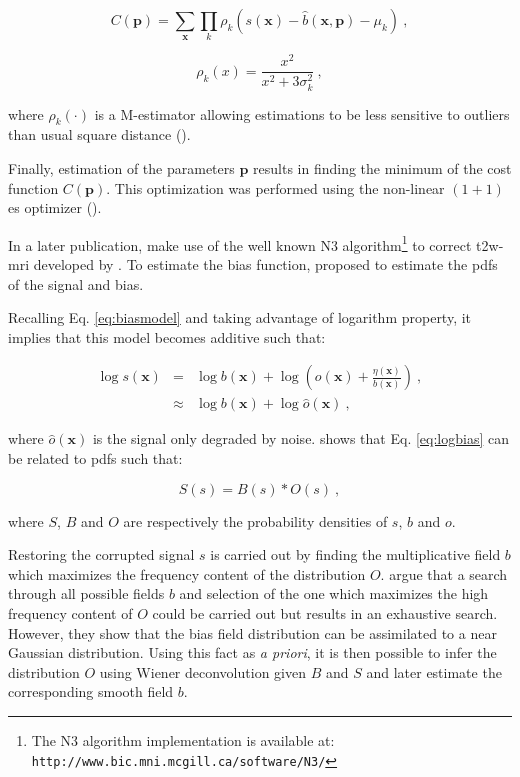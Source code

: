 \begin{enumerate}[leftmargin=*]
\begin{equation}
	C(\mathbf{p}) = \sum_{\mathbf{x}} \prod_{k} \rho_k(s(\mathbf{x}) - \hat{b}(\mathbf{x},\mathbf{p}) - \mu_k) \ ,
	\label{eq:costbias}
\end{equation}

\begin{equation}
	\rho_k(x) = \frac{x^2}{x^2 + 3 \sigma_k^2} \ ,
	\label{eq:mestbias}
\end{equation}

\noindent where $\rho_k(\cdot)$ is a M-estimator allowing estimations to be less sensitive to outliers than usual square distance (\cite{Li1996}).

Finally, estimation of the parameters $\mathbf{p}$ results in finding the minimum of the cost function $C(\mathbf{p})$. This optimization was performed using the non-linear $(1+1)$ \ac{es} optimizer (\cite{Styner1997}).

In a later publication, \cite{Viswanath2012} make use of the well known N3 algorithm\footnote{The N3 algorithm implementation is available at: \texttt{http://www.bic.mni.\allowbreak mcgill.ca/software/N3/}} to correct \ac{t2w}-\ac{mri} developed by \cite{Sled1998}. To estimate the bias function, \cite{Sled1998} proposed to estimate the \acp{pdf} of the signal and bias.

Recalling Eq. \eqref{eq:biasmodel} and taking advantage of logarithm property, it implies that this model becomes additive such that:

\begin{eqnarray}
	\log s(\mathbf{x}) & = & \log b(\mathbf{x}) + \log \left( o(\mathbf{x}) + \frac{\eta(\mathbf{x})}{b(\mathbf{x})} \right) \ , \nonumber \\
	& \approx & \log b(\mathbf{x}) + \log \hat{o}(\mathbf{x}) \ , \label{eq:logbias}
\end{eqnarray}

\noindent where $\hat{o}(\mathbf{x})$ is the signal only degraded by noise. \cite{Sled1998} shows that Eq. \eqref{eq:logbias} can be related to \acp{pdf} such that:

\begin{equation}
	S(s) = B(s) * O(s) \ ,
	\label{eq:distrbias} 
\end{equation}

\noindent where $S$, $B$ and $O$ are respectively the probability densities of $s$, $b$ and $o$.

Restoring the corrupted signal $s$ is carried out by finding the multiplicative field $b$ which maximizes the frequency content of the distribution $O$. \cite{Sled1998} argue that a search through all possible fields $b$ and selection of the one which maximizes the high frequency content of $O$ could be carried out but results in an exhaustive search. However, they show that the bias field distribution can be assimilated to a near Gaussian distribution. Using this fact as \textit{a priori}, it is then possible to infer the distribution $O$ using Wiener deconvolution given $B$ and $S$ and later estimate the corresponding smooth field $b$.


\end{enumerate}
